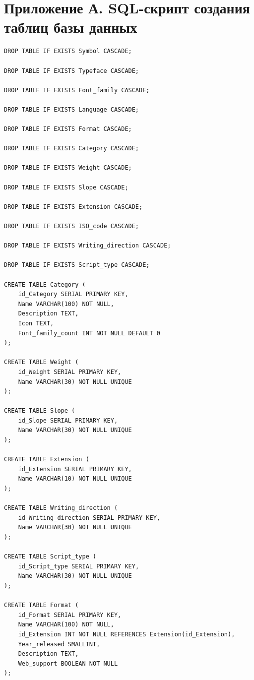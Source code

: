 \section*{Приложение А. SQL-скрипт создания таблиц базы данных}
\label{app:init-sql}

\renewcommand{\theFancyVerbLine}{%
    \scriptsize\ttfamily\textcolor{gray}{\arabic{FancyVerbLine}}%
}

\begin{verbatim}
DROP TABLE IF EXISTS Symbol CASCADE;

DROP TABLE IF EXISTS Typeface CASCADE;

DROP TABLE IF EXISTS Font_family CASCADE;

DROP TABLE IF EXISTS Language CASCADE;

DROP TABLE IF EXISTS Format CASCADE;

DROP TABLE IF EXISTS Category CASCADE;

DROP TABLE IF EXISTS Weight CASCADE;

DROP TABLE IF EXISTS Slope CASCADE;

DROP TABLE IF EXISTS Extension CASCADE;

DROP TABLE IF EXISTS ISO_code CASCADE;

DROP TABLE IF EXISTS Writing_direction CASCADE;

DROP TABLE IF EXISTS Script_type CASCADE;

CREATE TABLE Category (
    id_Category SERIAL PRIMARY KEY,
    Name VARCHAR(100) NOT NULL,
    Description TEXT,
    Icon TEXT,
    Font_family_count INT NOT NULL DEFAULT 0
);

CREATE TABLE Weight (
    id_Weight SERIAL PRIMARY KEY,
    Name VARCHAR(30) NOT NULL UNIQUE
);

CREATE TABLE Slope (
    id_Slope SERIAL PRIMARY KEY,
    Name VARCHAR(30) NOT NULL UNIQUE
);

CREATE TABLE Extension (
    id_Extension SERIAL PRIMARY KEY,
    Name VARCHAR(10) NOT NULL UNIQUE
);

CREATE TABLE Writing_direction (
    id_Writing_direction SERIAL PRIMARY KEY,
    Name VARCHAR(30) NOT NULL UNIQUE
);

CREATE TABLE Script_type (
    id_Script_type SERIAL PRIMARY KEY,
    Name VARCHAR(30) NOT NULL UNIQUE
);

CREATE TABLE Format (
    id_Format SERIAL PRIMARY KEY,
    Name VARCHAR(100) NOT NULL,
    id_Extension INT NOT NULL REFERENCES Extension(id_Extension),
    Year_released SMALLINT,
    Description TEXT,
    Web_support BOOLEAN NOT NULL
);


\end{verbatim}
